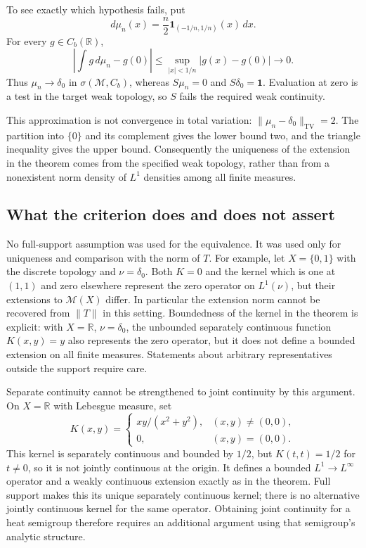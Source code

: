 To see exactly which hypothesis fails, put
\[
d\mu_n(x)=\frac n2\mathbf1_{(-1/n,1/n)}(x)\,dx.
\]
For every $g\in C_b(\mathbb R)$,
\[
\left|\int g\,d\mu_n-g(0)\right|
\leq\sup_{|x|<1/n}|g(x)-g(0)|\longrightarrow0.
\]
Thus $\mu_n\to\delta_0$ in $\sigma(\mathcal M,C_b)$, whereas
$S\mu_n=0$ and $S\delta_0=\mathbf1$. Evaluation at zero is a test
in the target weak topology, so $S$ fails the required weak continuity.

This approximation is not convergence in total variation:
$\|\mu_n-\delta_0\|_{\mathrm{TV}}=2$. The partition into $\{0\}$
and its complement gives the lower bound two, and the triangle
inequality gives the upper bound. Consequently the uniqueness of the
extension in the theorem comes from the specified weak topology,
rather than from a nonexistent norm density of $L^1$ densities among
all finite measures.

\subsection{What the criterion does and does not assert}
No full-support assumption was used for the equivalence. It was used
only for uniqueness and comparison with the norm of $T$.
For example, let $X=\{0,1\}$ with the discrete topology and
$\nu=\delta_0$. Both $K=0$ and the kernel which is one at $(1,1)$
and zero elsewhere represent the zero operator on $L^1(\nu)$,
but their extensions to $\mathcal M(X)$ differ. In particular the
extension norm cannot be recovered from $\|T\|$ in this setting.
Boundedness of the kernel in the theorem is explicit: with
$X=\mathbb R$, $\nu=\delta_0$, the unbounded separately continuous
function $K(x,y)=y$ also represents the zero operator, but it does
not define a bounded extension on all finite measures. Statements
about arbitrary representatives outside the support require care.

Separate continuity cannot be strengthened to joint continuity by
this argument. On $X=\mathbb R$ with Lebesgue measure, set
\[
K(x,y)=
\begin{cases}
xy/(x^2+y^2),&(x,y)\ne(0,0),\\
0,&(x,y)=(0,0).
\end{cases}
\]
This kernel is separately continuous and bounded by $1/2$, but
$K(t,t)=1/2$ for $t\ne0$, so it is not jointly continuous at the
origin. It defines a bounded $L^1\to L^\infty$ operator and a
weakly continuous extension exactly as in the theorem. Full support
makes this its unique separately continuous kernel; there is no
alternative jointly continuous kernel for the same operator.
Obtaining joint continuity for a heat semigroup therefore requires
an additional argument using that semigroup's analytic structure.


